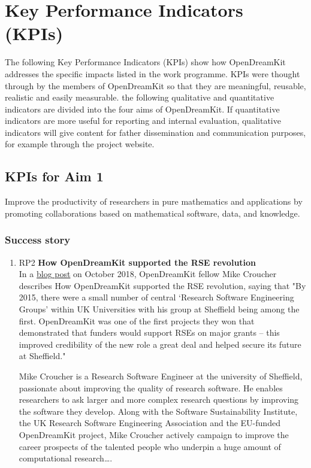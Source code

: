 
\section{Key Performance Indicators (KPIs)}

The following Key Performance Indicators (KPIs) show how OpenDreamKit addresses the specific impacts listed in the work
programme. KPIs were thought through by the members of OpenDreamKit so that they are meaningful, reusable, realistic and easily measurable.
the following qualitative and quantitative indicators are divided into the four aims of OpenDreamKit. If quantitative indicators are more
useful for reporting and internal evaluation, qualitative indicators will give content for father dissemination and communication purposes,
for example through the project website.


\subsection{KPIs for Aim 1}

\begin{aim}
  Improve the productivity of researchers in pure mathematics and
  applications by promoting collaborations based on mathematical
  software, data, and knowledge.
\end{aim}

\subsubsection{Success story}

\begin{enumerate}
\item RP2 \textbf{How OpenDreamKit supported the RSE revolution}\\
  In a \href{https://opendreamkit.org/2018/10/29/ODK-RSE/}{blog post}
  on October 2018, OpenDreamKit fellow Mike Croucher describes How
  OpenDreamKit supported the RSE revolution, saying that "By 2015,
  there were a small number of central ‘Research Software Engineering
  Groups’ within UK Universities with his group at Sheffield being
  among the first. OpenDreamKit was one of the first projects they won
  that demonstrated that funders would support RSEs on major grants –
  this improved credibility of the new role a great deal and helped
  secure its future at Sheffield."

  \noindent
  Mike Croucher is a Research Software Engineer at the university
  of Sheffield, passionate about improving the quality of research
  software. He enables researchers to ask larger and more complex
  research questions by improving the software they develop. Along
  with the Software Sustainability Institute, the UK Research Software
  Engineering Association and the EU-funded OpenDreamKit project,
  Mike Croucher actively campaign to improve the career prospects
  of the talented people who underpin a huge amount of computational
  research….
\end{enumerate}

